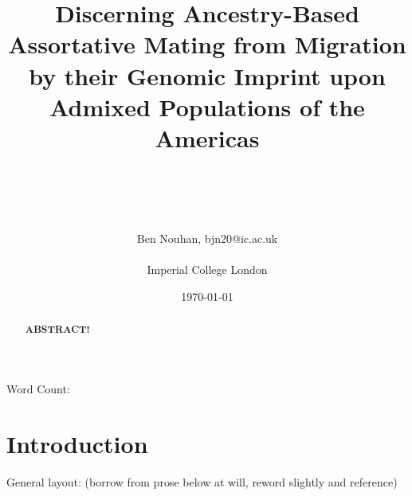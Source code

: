 \documentclass[11pt]{article}
\title{Discerning Ancestry-Based Assortative Mating from Migration by their Genomic Imprint upon Admixed Populations of the Americas}
\author{\\ \\ \\ \\ Ben Nouhan, bjn20@ic.ac.uk \\ \\ Imperial College London \\}
\date{\today}
\newcommand\wordcount{}
\begin{document}
\vspace{30mm}
\maketitle
\thispagestyle{empty}

\vspace{5mm}
\centerline{Word Count: \wordcount}

\vspace{15mm}
\onehalfspacing
\renewcommand{\abstractname}{\vspace{-\baselineskip}} %

\begin{abstract}
    \linenumbers
    \noindent
    \textbf{
        ABSTRACT!
    }
\end{abstract}
\vspace{10mm}


\newpage
\tableofcontents
\thispagestyle{empty}

\newpage
\linenumbers


\setcounter{page}{1}
\section{Introduction}

General layout: (borrow from prose below at will, reword slightly and reference)
\end{document}
